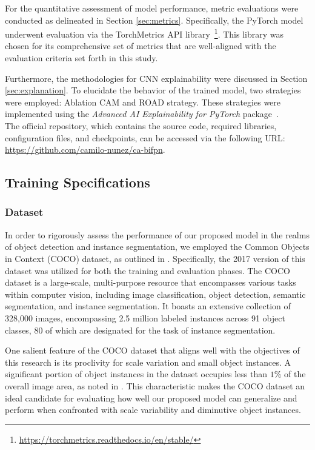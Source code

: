 For the quantitative assessment of model performance, metric evaluations were conducted as delineated in Section \ref{sec:metrics}. Specifically, the PyTorch model underwent evaluation via the TorchMetrics API library~\footnote{\url{https://torchmetrics.readthedocs.io/en/stable/}}. This library was chosen for its comprehensive set of metrics that are well-aligned with the evaluation criteria set forth in this study.

Furthermore, the methodologies for CNN explainability were discussed in Section \ref{sec:explanation}. To elucidate the behavior of the trained model, two strategies were employed: Ablation CAM and ROAD strategy. These strategies were implemented using the \textit{Advanced AI Explainability for PyTorch} package~\cite{jacobgilpytorchcam}.\\

The official repository, which contains the source code, required libraries, configuration files, and checkpoints, can be accessed via the following URL: \url{https://github.com/camilo-nunez/ca-bifpn}.
\subsection{Training Specifications}

\subsubsection{Dataset}
In order to rigorously assess the performance of our proposed model in the realms of object detection and instance segmentation, we employed the Common Objects in Context (COCO) dataset, as outlined in \cite{DBLP:journals/corr/LinMBHPRDZ14}. Specifically, the 2017 version of this dataset was utilized for both the training and evaluation phases. The COCO dataset is a large-scale, multi-purpose resource that encompasses various tasks within computer vision, including image classification, object detection, semantic segmentation, and instance segmentation. It boasts an extensive collection of 328,000 images, encompassing 2.5 million labeled instances across 91 object classes, 80 of which are designated for the task of instance segmentation.

One salient feature of the COCO dataset that aligns well with the objectives of this research is its proclivity for scale variation and small object instances. A significant portion of object instances in the dataset occupies less than $1\%$ of the overall image area, as noted in \cite{DBLP:journals/corr/abs-1711-08189}. This characteristic makes the COCO dataset an ideal candidate for evaluating how well our proposed model can generalize and perform when confronted with scale variability and diminutive object instances.

